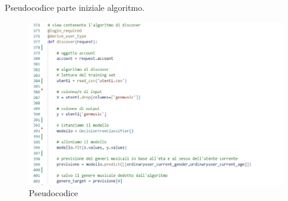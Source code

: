 Pseudocodice parte iniziale algoritmo. 
\begin{figure}[H]
    \centering
    \begin{center}
        \includegraphics[scale=0.7]{images/alg1.jpg}
    \end{center}
    \caption{Pseudocodice}
    \label{fig-pseudocodice-1}
\end{figure}




